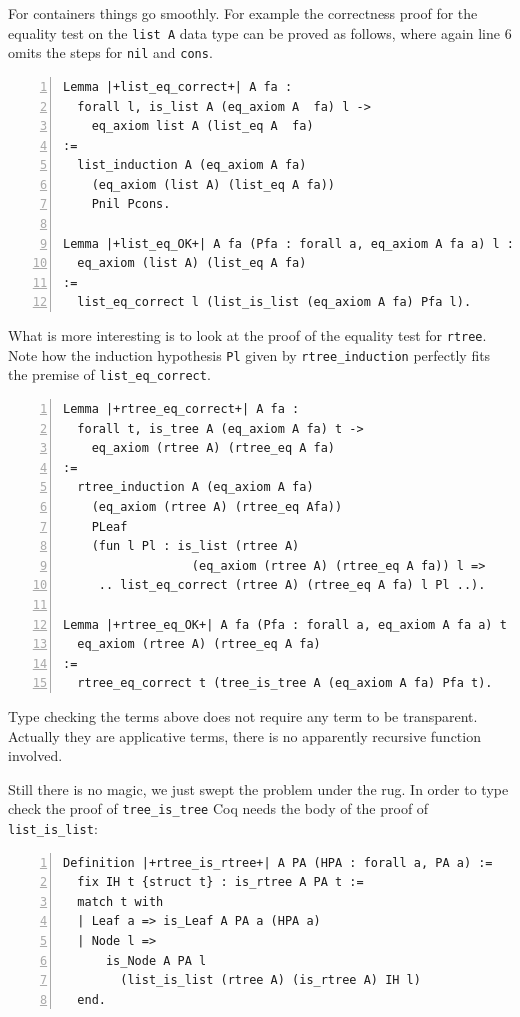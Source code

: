 \documentclass[sigplan,10pt,review]{acmart}\settopmatter{printfolios=true,printccs=false,printacmref=false}
\begin{document}
For containers things go smoothly. For example the correctness proof
for the equality test on the \lstinline+list A+ data type can be
proved as follows, where again line 6 omits the steps for
\lstinline+nil+ and \lstinline+cons+.

\begin{lstlisting}[numbers=left]
Lemma |+list_eq_correct+| A fa :
  forall l, is_list A (eq_axiom A  fa) l ->
    eq_axiom list A (list_eq A  fa)
:=
  list_induction A (eq_axiom A fa)
    (eq_axiom (list A) (list_eq A fa))
    Pnil Pcons.

Lemma |+list_eq_OK+| A fa (Pfa : forall a, eq_axiom A fa a) l :
  eq_axiom (list A) (list_eq A fa)
:=
  list_eq_correct l (list_is_list (eq_axiom A fa) Pfa l).
\end{lstlisting}

\noindent
What is more interesting is to look at the proof of the equality test
for \lstinline+rtree+. Note how the induction hypothesis
\lstinline+Pl+
given by \lstinline+rtree_induction+ perfectly fits
the premise of \lstinline+list_eq_correct+.

\begin{lstlisting}[numbers=left]
Lemma |+rtree_eq_correct+| A fa :
  forall t, is_tree A (eq_axiom A fa) t ->
    eq_axiom (rtree A) (rtree_eq A fa)
:=
  rtree_induction A (eq_axiom A fa)
    (eq_axiom (rtree A) (rtree_eq Afa))
    PLeaf
    (fun l Pl : is_list (rtree A) 
                  (eq_axiom (rtree A) (rtree_eq A fa)) l =>
     .. list_eq_correct (rtree A) (rtree_eq A fa) l Pl ..).

Lemma |+rtree_eq_OK+| A fa (Pfa : forall a, eq_axiom A fa a) t :
  eq_axiom (rtree A) (rtree_eq A fa)
:=
  rtree_eq_correct t (tree_is_tree A (eq_axiom A fa) Pfa t).
\end{lstlisting}

Type checking the terms above does not require any term to be
transparent. Actually they are applicative terms, there is no
apparently recursive function involved.

Still there is no magic, we just swept the problem under the rug.
In order to type check the proof
of \lstinline+tree_is_tree+ Coq needs the body
of the proof of \lstinline+list_is_list+:

\begin{lstlisting}[numbers=left]
Definition |+rtree_is_rtree+| A PA (HPA : forall a, PA a) :=
  fix IH t {struct t} : is_rtree A PA t :=
  match t with
  | Leaf a => is_Leaf A PA a (HPA a)
  | Node l =>
      is_Node A PA l
        (list_is_list (rtree A) (is_rtree A) IH l)
  end.
\end{lstlisting}
\end{document}
